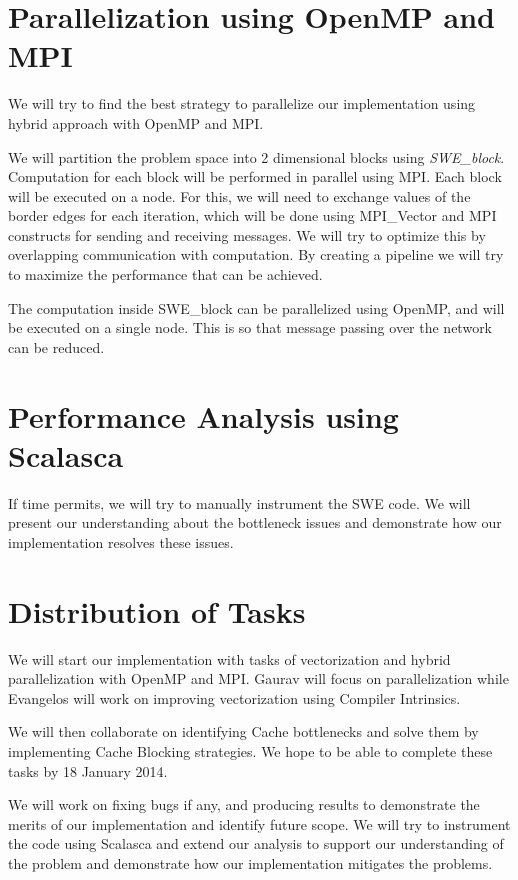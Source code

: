 \documentclass[]{article}
\begin{document}
\section{Parallelization using OpenMP and MPI}
We will try to find the best strategy to parallelize our implementation using hybrid
approach with OpenMP and MPI. 

We will partition the problem space into 2 dimensional blocks using \textit{SWE\_block}. Computation
for each block will be performed in parallel using MPI. Each block will be executed on a node.
For this, we will need to exchange values of the border edges for each iteration, which will
be done using MPI\_Vector and MPI constructs for sending and receiving messages. We will try
to optimize this by overlapping communication with computation.
By creating a pipeline we will try to maximize the performance that can be achieved.

The computation inside SWE\_block can be parallelized
using OpenMP, and will be executed on a single node. This is so that message passing
over the network can be reduced.

\section{Performance Analysis using Scalasca}
If time permits, we will try to manually instrument the SWE code. We will present our
understanding about the bottleneck issues and demonstrate how our implementation
resolves these issues.

\section{Distribution of Tasks}
We will start our implementation with tasks of vectorization and hybrid parallelization
with OpenMP and MPI. Gaurav will focus on parallelization while Evangelos will work
on improving vectorization using Compiler Intrinsics. 

We will then collaborate on identifying Cache bottlenecks and solve them by implementing
Cache Blocking strategies. We hope to be able to complete these tasks by 18 January 2014.

We will work on fixing bugs if any, and producing results to demonstrate the merits of our
implementation and identify future scope. We will try to instrument the code using Scalasca
and extend our analysis to support our understanding of the problem and demonstrate how our implementation mitigates the problems.
\end{document}
